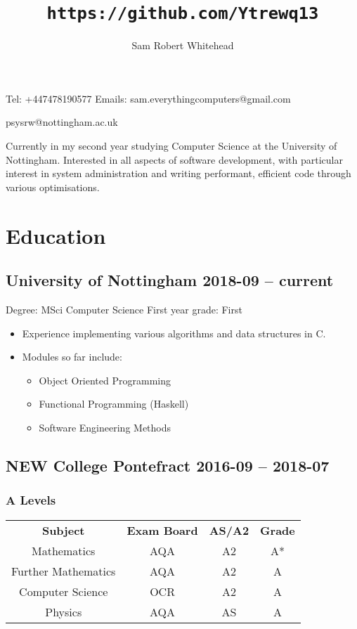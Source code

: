 \documentclass[10pt]{extarticle}
\renewcommand{\maketitle}{\begin{center}\huge\bfseries\theauthor\end{center}\begin{center}\Large\thetitle\end{center}}
\begin{document}
    \title{\texttt{https://github.com/Ytrewq13}}
    \author{Sam Robert Whitehead}

    \maketitle

    \pagestyle{empty}

    Tel: +447478190577
    \hfill
    Emails: sam.everythingcomputers@gmail.com
    \begin{flushright}
        psysrw@nottingham.ac.uk
    \end{flushright}
    Currently in my second year studying Computer Science at the University of Nottingham. Interested in all aspects of software development, with particular interest in system administration and writing performant, efficient code through various optimisations.
    \section{Education}
    \subsection{University of Nottingham
    \hfill 2018-09 -- current}
    Degree: MSci Computer Science
    \hfill
    First year grade: First
    \begin{itemize}
        \item Experience implementing various algorithms and data structures in C.
        \item Modules so far include:
            \begin{itemize}
                \item Object Oriented Programming
                \item Functional Programming (Haskell)
                \item Software Engineering Methods
            \end{itemize}
    \end{itemize}
    \subsection{NEW College Pontefract
    \hfill 2016-09 -- 2018-07}
    \subsubsection{A Levels}
    \begin{tabular}{cccc}
        \textbf{Subject} & \textbf{Exam Board} & \textbf{AS/A2} & \textbf{Grade} \\
        Mathematics & AQA & A2 & A* \\
        Further Mathematics & AQA & A2 & A \\
        Computer Science & OCR & A2 & A \\
        Physics & AQA & AS & A
    \end{tabular}
\end{document}
